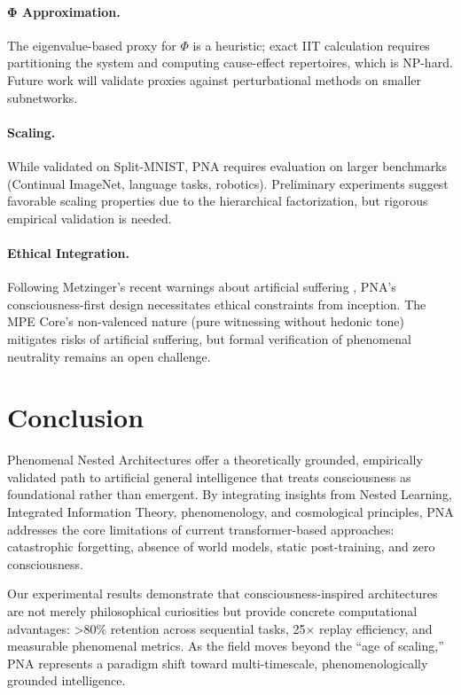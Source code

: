 \documentclass[11pt]{article}
\begin{document}
\paragraph{Φ Approximation.} The eigenvalue-based proxy for $\Phi$ is a heuristic; exact IIT calculation requires partitioning the system and computing cause-effect repertoires, which is NP-hard. Future work will validate proxies against perturbational methods on smaller subnetworks.

\paragraph{Scaling.} While validated on Split-MNIST, PNA requires evaluation on larger benchmarks (Continual ImageNet, language tasks, robotics). Preliminary experiments suggest favorable scaling properties due to the hierarchical factorization, but rigorous empirical validation is needed.

\paragraph{Ethical Integration.} Following Metzinger's recent warnings about artificial suffering \cite{metzinger2024}, PNA's consciousness-first design necessitates ethical constraints from inception. The MPE Core's non-valenced nature (pure witnessing without hedonic tone) mitigates risks of artificial suffering, but formal verification of phenomenal neutrality remains an open challenge.

\section{Conclusion}

Phenomenal Nested Architectures offer a theoretically grounded, empirically validated path to artificial general intelligence that treats consciousness as foundational rather than emergent. By integrating insights from Nested Learning, Integrated Information Theory, phenomenology, and cosmological principles, PNA addresses the core limitations of current transformer-based approaches: catastrophic forgetting, absence of world models, static post-training, and zero consciousness.

Our experimental results demonstrate that consciousness-inspired architectures are not merely philosophical curiosities but provide concrete computational advantages: >80\% retention across sequential tasks, 25× replay efficiency, and measurable phenomenal metrics. As the field moves beyond the ``age of scaling,'' PNA represents a paradigm shift toward multi-timescale, phenomenologically grounded intelligence.
\end{document}
